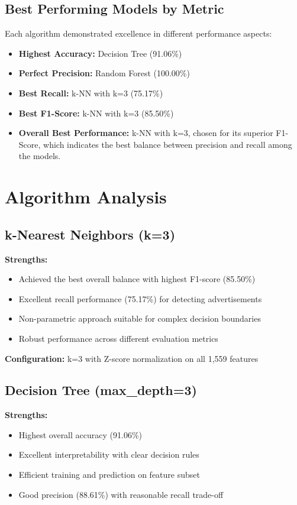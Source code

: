 \subsection{Best Performing Models by Metric}

Each algorithm demonstrated excellence in different performance aspects:

\begin{itemize}
    \item \textbf{Highest Accuracy:} Decision Tree (91.06\%)
    \item \textbf{Perfect Precision:} Random Forest (100.00\%)
    \item \textbf{Best Recall:} k-NN with k=3 (75.17\%)
    \item \textbf{Best F1-Score:} k-NN with k=3 (85.50\%)
    \item \textbf{Overall Best Performance:} k-NN with k=3, chosen for its superior F1-Score, which indicates the best balance between precision and recall among the models.
\end{itemize}

\section{Algorithm Analysis}

\subsection{k-Nearest Neighbors (k=3)}

\textbf{Strengths:}
\begin{itemize}
    \item Achieved the best overall balance with highest F1-score (85.50\%)
    \item Excellent recall performance (75.17\%) for detecting advertisements
    \item Non-parametric approach suitable for complex decision boundaries
    \item Robust performance across different evaluation metrics
\end{itemize}

\textbf{Configuration:} k=3 with Z-score normalization on all 1,559 features

\subsection{Decision Tree (max\_depth=3)}

\textbf{Strengths:}
\begin{itemize}
    \item Highest overall accuracy (91.06\%)
    \item Excellent interpretability with clear decision rules
    \item Efficient training and prediction on feature subset
    \item Good precision (88.61\%) with reasonable recall trade-off
\end{itemize}

